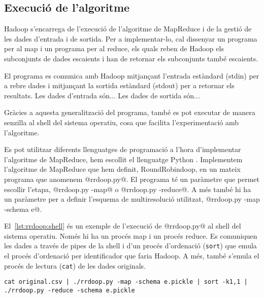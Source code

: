 \subsection{Execució de l'algoritme}



Hadoop s'encarrega de l'execució de l'algoritme de MapReduce i de la
gestió de les dades d'entrada i de sortida.  Per a implementar-lo, cal
dissenyar un programa per al map i un programa per al reduce, els
quals reben de Hadoop els subconjunts de dades escaients i han de
retornar els subconjunts també escaients.  

El programa es comunica amb Hadoop mitjançant l'entrada estàndard
(stdin) per a rebre dades i mitjançant la sortida estàndard (stdout)
per a retornar els resultats. 
Les dades d'entrada són... Les dades de sortida són...


Gràcies a aquesta generalització del programa, també
es pot executar de manera senzilla al shell del sistema operatiu, cosa
que facilita l'experimentació amb l'algoritme.




Es pot utilitzar diferents llenguatges de programació a l'hora
d'implementar l'algoritme de MapReduce, hem escollit el llenguatge
Python \parencite{python:doc2}.  Implementem l'algoritme de MapReduce
que hem definit, RoundRobindoop, en un mateix programa que anomenem
@rrdoop.py@. El programa té un paràmetre que permet escollir l'etapa,
@rrdoop.py -map@ o @rrdoop.py -reduce@. A més també hi ha un paràmetre
per a definir l'esquema de multiresolució utilitzat, %
@rrdoop.py -map -schema e@.





El~\autoref{lst:rrdoop:shell} és un exemple de l'execució de
@rrdoop.py@ al shell del sistema operatiu. Només hi ha un procés map i
un procés reduce. Es comuniquen les dades a través de pipes de la
shell i d'un procés d'ordenació (\texttt{sort}) que emula el procés
d'ordenació per identificador que faria Hadoop. A més, també s'emula
el procés de lectura (\texttt{cat}) de les dades originals.

\begin{lstlisting}[style=sh,caption=Execució a la shell de
  rrdoop.py,label=lst:rrdoop:shell]
cat original.csv | ./rrdoop.py -map -schema e.pickle | sort -k1,1 | ./rrdoop.py -reduce -schema e.pickle
\end{lstlisting}

